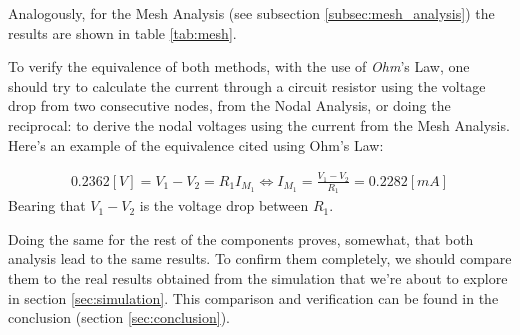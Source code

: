 Analogously, for the Mesh Analysis (see subsection \ref{subsec:mesh_analysis}) the results are shown in table \ref{tab:mesh}.

To verify the equivalence of both methods, with the use of \textit{Ohm}'s Law, one should try to calculate the current through a circuit resistor using the voltage drop from two consecutive nodes, from the Nodal Analysis, or doing the reciprocal: to derive the nodal voltages using the current from the Mesh Analysis.
Here's an example of the equivalence cited using Ohm's Law:

\begin{align}
    0.2362 [V] = V_1-V_2 = R_1I_{M_1} 
    \Longleftrightarrow I_{M_1} = \frac{V_1-V_2}{R_1} = 0.2282 [mA]  
\end{align}
Bearing that $V_1-V_2$ is the voltage drop between $R_1$.

Doing the same for the rest of the components proves, somewhat, that both analysis lead to the same results. To confirm them completely, we should compare them to the real results obtained from the simulation that we're about to explore in section \ref{sec:simulation}. This comparison and verification can be found in the conclusion (section \ref{sec:conclusion}).

\clearpage
